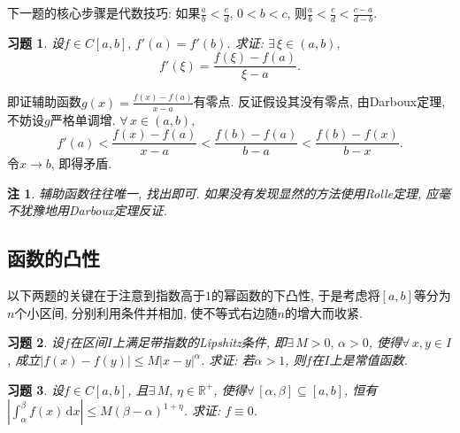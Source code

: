 \documentclass[11pt,a4paper]{ctexart}
\makeatletter
\theoremstyle{thmseries} %
\theoremstyle{exerseries}
\newtheorem{exer}{习题}[section]
\newtheorem*{rem}{注}
\renewenvironment{proof}[1][\proofname]{\par
  \pushQED{\qed}%
  \normalfont \topsep6\p@\@plus6\p@\relax
  \trivlist
  \item[\hskip\labelsep
        \itshape
    #1\@addpunct{}]\ignorespaces
}{%
  \popQED\endtrivlist\@endpefalse
}
\newenvironment{pf}{\begin{proof}[\bfseries\upshape 证\quad]}{\end{proof}}
\newcommand{\R}{\mathbb{R}}
\newcommand{\N}{\mathbb{N}}
\renewcommand{\d}{\mathrm{d}}
\def \nti {\mathnormal{n}\to\infty}
\makeatother
\begin{document}
下一题的核心步骤是代数技巧: 如果$\frac{a}{b}<\frac{c}{d},\,0<b<c$, 则$\frac{a}{b}<\frac{c}{d}<\frac{c-a}{d-b}$. 
\begin{exer}
	设$f\in C[a,b],\,f'(a)=f'(b)$. 求证: $\exists\,\xi\in(a,b),$
	\[f'(\xi)=\frac{f(\xi)-f(a)}{\xi-a}.\]
\end{exer}
\begin{pf}
	即证辅助函数$g(x)=\frac{f(x)-f(a)}{x-a}$有零点. 反证假设其没有零点, 由Darboux定理, 不妨设$g$严格单调增. $\forall\,x\in(a,b),$
	\[f'(a)<\frac{f(x)-f(a)}{x-a}<\frac{f(b)-f(a)}{b-a}<\frac{f(b)-f(x)}{b-x}.\]
	令$x\to b$, 即得矛盾. 
\end{pf}
\begin{rem}
	辅助函数往往唯一, 找出即可. 如果没有发现显然的方法使用Rolle定理, 应毫不犹豫地用Darboux定理反证. 
\end{rem}




\subsection{函数的凸性}
以下两题的关键在于注意到指数高于$1$的幂函数的下凸性, 于是考虑将$[a,b]$等分为$n$个小区间, 分别利用条件并相加, 使不等式右边随$n$的增大而收紧. 
\begin{exer}
	设$f$在区间$I$上满足带指数的Lipshitz条件, 即$\exists\,M>0,\,\alpha>0$, 使得$\forall\,x,y\in I$, 成立$|f(x)-f(y)|\leq M|x-y|^\alpha$. 求证: 若$\alpha>1$, 则$f$在$I$上是常值函数. 
\end{exer}

\begin{exer}
	设$f\in C[a,b]$, 且$\exists\,M,\,\eta\in\R^+$, 使得$\forall\,[\alpha,\beta]\subseteq[a,b]$, 恒有$\left|\int_{\alpha}^{\beta}f(x)\,\d x\right|\leq M(\beta-\alpha)^{1+\eta}$. 求证: $f\equiv0$. 
\end{exer}
\end{document}
